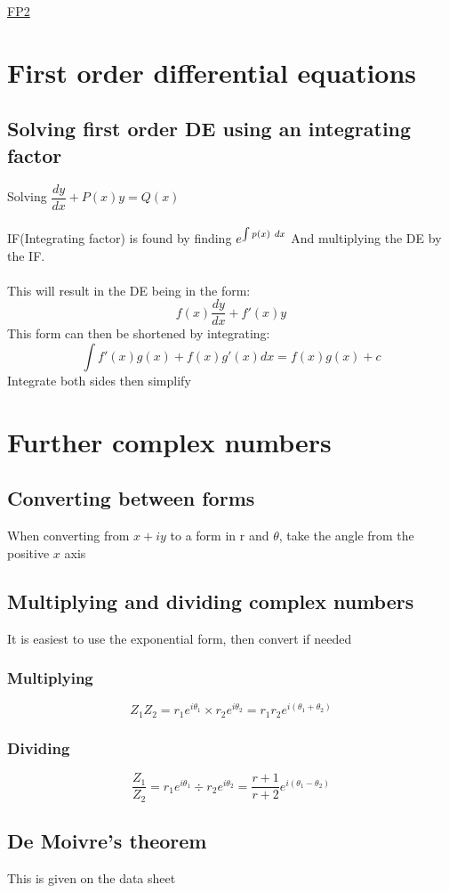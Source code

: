 \documentclass{article}[18pt]
\begin{document}
\begin{center}
\underline{\huge FP2}
\end{center}
\section{First order differential equations}
\subsection{Solving first order DE using an integrating factor}
Solving $\dfrac{dy}{dx}+P(x)y=Q(x)$\\
\\
IF(Integrating factor) is found by finding $\mathlarger{e^{\int p(x) \ dx}}$ And multiplying the DE by the IF.\\
\\
This will result in the DE being in the form:
$$f(x)\frac{dy}{dx}+f'(x)y$$
This form can then be shortened by integrating:
$$\int f'(x)g(x)+f(x)g'(x) dx=f(x)g(x)+c$$
Integrate both sides then simplify
\section{Further complex numbers}
\subsection{Converting between forms}
When converting from $x+iy$ to a form in r and $\theta$, take the angle from the positive $x$ axis
\subsection{Multiplying and dividing complex numbers}
It is easiest to use the exponential form, then convert if needed
\subsubsection{Multiplying}
$$Z_1Z_2=r_1e^{i\theta_1}\times r_2e^{i\theta_2}=r_1r_2e^{i(\theta_1+\theta_2)}$$
\subsubsection{Dividing}
$$\frac{Z_1}{Z_2}=r_1e^{i\theta_1}\div r_2e^{i\theta_2}=\frac{r+1}{r+2} e^{i(\theta_1-\theta_2)}$$
\subsection{De Moivre's theorem}
This is given on the data sheet
\end{document}
